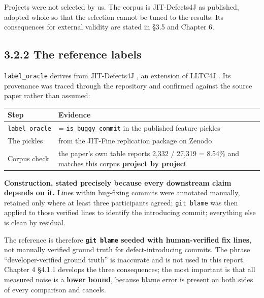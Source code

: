 Projects were not selected by us. The corpus is JIT-Defects4J as
published, adopted whole so that the selection cannot be tuned to the
results. Its consequences for external validity are stated in \S{}3.5 and
Chapter 6.

\subsection{3.2.2 The reference labels}\label{the-reference-labels}

\texttt{label\_oracle} derives from JIT-Defects4J
\citep{ni2022jitdefects4j}, an extension of LLTC4J
\citep{herbold2022tangling}. Its provenance was traced through the
repository and confirmed against the source paper rather than assumed:

\begin{longtable}[]{@{}
  >{\raggedright\arraybackslash}p{}
  >{\raggedright\arraybackslash}p{}@{}}
\toprule\noalign{}
\begin{minipage}[b]{\linewidth}\raggedright
Step
\end{minipage} & \begin{minipage}[b]{\linewidth}\raggedright
Evidence
\end{minipage} \\
\midrule\noalign{}
\endhead
\bottomrule\noalign{}
\endlastfoot
\texttt{label\_oracle} & = \texttt{is\_buggy\_commit} in the published
feature pickles \\
The pickles & from the JIT-Fine replication package on Zenodo \\
Corpus check & the paper's own table reports 2,332 / 27,319 = 8.54\% and
matches this corpus \textbf{project by project} \\
\end{longtable}

\textbf{Construction, stated precisely because every downstream claim
depends on it.} Lines within bug-fixing commits were annotated manually,
retained only where at least three participants agreed;
\texttt{git\ blame} was then applied to those verified lines to identify
the introducing commit; everything else is clean by residual.

The reference is therefore \textbf{\texttt{git\ blame} seeded with
human-verified fix lines}, not manually verified ground truth for
defect-introducing commits. The phrase ``developer-verified ground
truth'' is inaccurate and is not used in this report. Chapter 4 \S{}4.1.1
develops the three consequences; the most important is that all measured
noise is a \textbf{lower bound}, because blame error is present on both
sides of every comparison and cancels.

